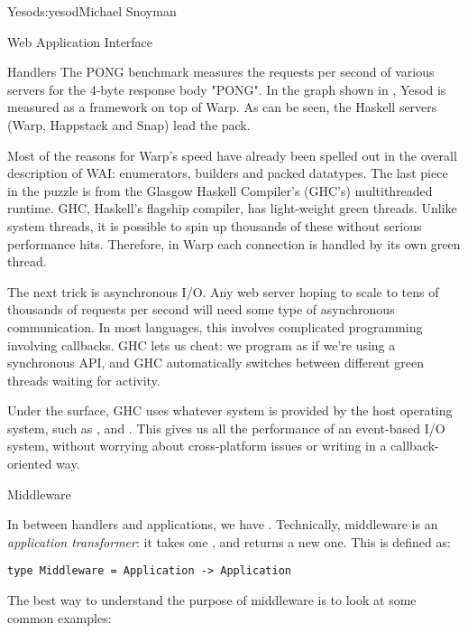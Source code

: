 \begin{aosachapter}{Yesod}{s:yesod}{Michael Snoyman}
\begin{aosasect1}{Web Application Interface}
\begin{aosasect2}{Handlers}
The PONG benchmark measures the requests per second of various servers
for the 4-byte response body "PONG". In the graph shown in , Yesod is measured
as a framework on top of Warp. As can be seen, the Haskell servers
(Warp, Happstack and Snap) lead the pack.


Most of the reasons for Warp's speed have already been spelled out in
the overall description of WAI: enumerators, builders and packed
datatypes. The last piece in the puzzle is from the Glasgow Haskell
Compiler's (GHC's) multithreaded runtime. GHC, Haskell's flagship
compiler, has light-weight green threads. Unlike system threads, it is
possible to spin up thousands of these without serious performance
hits. Therefore, in Warp each connection is handled by its own green
thread.

The next trick is asynchronous I/O. Any web server hoping to scale to
tens of thousands of requests per second will need some type of
asynchronous communication. In most languages, this involves
complicated programming involving callbacks. GHC lets us cheat: we
program as if we're using a synchronous API, and GHC automatically
switches between different green threads waiting for activity.

Under the surface, GHC uses whatever system is provided by the host
operating system, such as ,  and
. This gives us all the performance of an event-based I/O
system, without worrying about cross-platform issues or writing in a
callback-oriented way.

\end{aosasect2}

\begin{aosasect2}{Middleware}


In between handlers and applications, we have
. Technically, middleware is an \emph{application
  transformer}: it takes one , and returns a new one. This
is defined as:

\begin{verbatim}
type Middleware = Application -> Application
\end{verbatim}

\noindent The best way to understand the purpose of middleware is to look at
some common examples:


\end{aosasect2}
\end{aosasect1}
\end{aosachapter}
